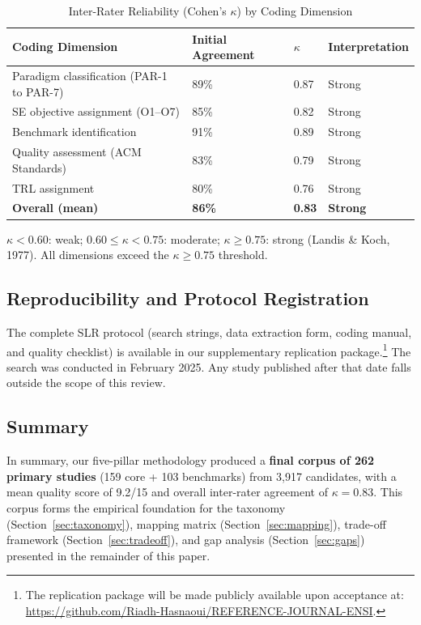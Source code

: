 \begin{table}[htbp]
\renewcommand{\arraystretch}{1.35}
\caption{Inter-Rater Reliability (Cohen's $\kappa$) by Coding Dimension}
\label{tab:irr}
\centering
\begin{tabular}{L{3.2cm}C{1.4cm}C{1.0cm}L{2.2cm}}
\toprule
\textbf{Coding Dimension} & \textbf{Initial Agreement} & \textbf{$\kappa$} & \textbf{Interpretation} \\
\midrule
Paradigm classification (PAR-1 to PAR-7) & 89\% & 0.87 & Strong \\
SE objective assignment (O1--O7) & 85\% & 0.82 & Strong \\
Benchmark identification & 91\% & 0.89 & Strong \\
Quality assessment (ACM Standards) & 83\% & 0.79 & Strong \\
TRL assignment & 80\% & 0.76 & Strong \\
\midrule
\textbf{Overall (mean)} & \textbf{86\%} & \textbf{0.83} & \textbf{Strong} \\
\bottomrule
\end{tabular}
\begin{tablenotes}
\small
\item $\kappa < 0.60$: weak; $0.60 \leq \kappa < 0.75$: moderate;
      $\kappa \geq 0.75$: strong (Landis \& Koch, 1977).
      All dimensions exceed the $\kappa \geq 0.75$ threshold.
\end{tablenotes}
\end{table}

\subsection{Reproducibility and Protocol Registration}

The complete SLR protocol (search strings, data extraction form, coding manual,
and quality checklist) is available in our supplementary replication
package.\footnote{The replication package will be made publicly available upon
acceptance at: \url{https://github.com/Riadh-Hasnaoui/REFERENCE-JOURNAL-ENSI}.}
The search was conducted in February 2025. Any study published after that date
falls outside the scope of this review.

\subsection{Summary}

In summary, our five-pillar methodology produced a \textbf{final corpus of 262
primary studies} (159 core + 103 benchmarks) from 3,917 candidates, with a
mean quality score of 9.2/15 and overall inter-rater agreement of
$\kappa = 0.83$. This corpus forms the empirical foundation for the taxonomy
(Section~\ref{sec:taxonomy}), mapping matrix (Section~\ref{sec:mapping}),
trade-off framework (Section~\ref{sec:tradeoff}), and gap analysis
(Section~\ref{sec:gaps}) presented in the remainder of this paper.
